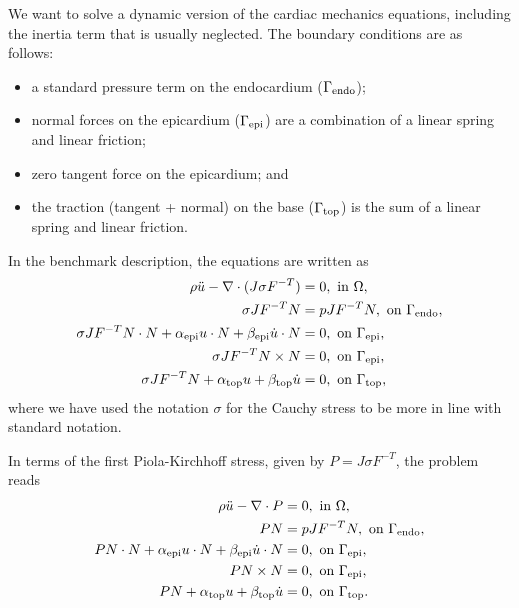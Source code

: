 \documentclass[a4paper,10pt]{article}
\begin{document}
We want to solve a dynamic version of the cardiac mechanics equations, including the
inertia term that is usually neglected. The boundary conditions are as follows:
\begin{itemize}
\item a standard pressure term on the endocardium ($\Gamma_{\rm endo}$);
\item normal forces on the epicardium ($\Gamma_{\rm epi}$) are a combination of a linear spring
and linear friction;
\item zero tangent force on the epicardium; and
\item the traction (tangent + normal) on the base ($\Gamma_{\rm top}$) is the sum of
a linear spring and linear friction.
\end{itemize}
In the benchmark description, the equations are written as
\begin{align*}
  \rho \ddot{u} - \nabla\cdot(J\sigma F^{-T}) &= 0, \mbox{ in } \Omega ,\\
  \sigma J F^{-T}N &= pJF^{-T}N, \mbox{ on } \Gamma_{\rm endo}, \\
  \sigma JF^{-T}N\cdot N + \alpha_{\rm epi}u\cdot N + \beta_{\rm epi}\dot{u}\cdot N &= 0, \mbox{ on }  \Gamma_{\rm epi}, \\
  \sigma JF^{-T}N\times N &=0, \mbox{ on }  \Gamma_{\rm epi}, \\
  \sigma JF^{-T}N + \alpha_{\rm top}u + \beta_{\rm top}\dot{u} &= 0, \mbox{ on } \Gamma_{\rm top},
\end{align*}
where we have used the notation $\sigma$ for the Cauchy stress to be more in line with standard notation.

In terms of the first Piola-Kirchhoff stress, given by $P = J\sigma F^{-T}$, the problem reads
\begin{align}
  \rho \ddot{u} - \nabla\cdot P &= 0, \mbox{ in } \Omega ,\label{dyn_eq0}\\
  PN &= pJF^{-T}N, \mbox{ on } \Gamma_{\rm endo}, \\
  PN\cdot N + \alpha_{\rm epi}u\cdot N + \beta_{\rm epi}\dot{u}\cdot N &= 0, \mbox{ on }  \Gamma_{\rm epi}, \\
  PN\times N &=0, \mbox{ on }  \Gamma_{\rm epi}, \\
  PN + \alpha_{\rm top}u + \beta_{\rm top}\dot{u} &= 0, \mbox{ on } \Gamma_{\rm top}.\label{dyn_bc3}
\end{align}
\end{document}
